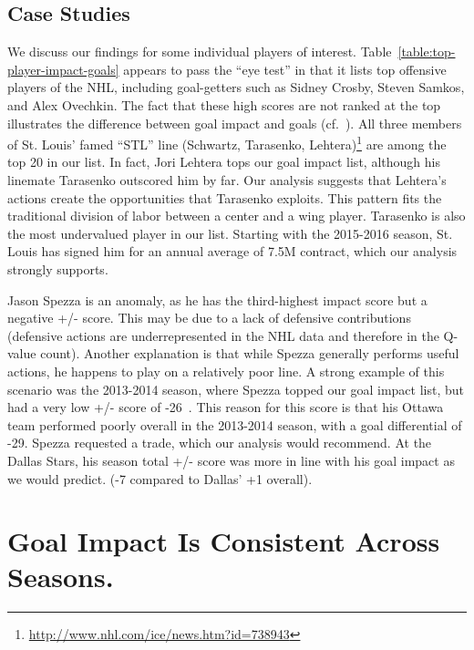 \documentclass[runningheads,a4paper]{llncs}
\begin{document}
\subsection{Case Studies} We discuss our findings for some individual players of interest.  Table~\ref{table:top-player-impact-goals} appears to pass the ``eye test'' in that it lists top offensive players of the NHL, including goal-getters such as Sidney Crosby, Steven Samkos, and Alex Ovechkin. The fact that these high scores are not ranked at the top illustrates the difference between goal impact and goals (cf.~\cite{Pettigrew2015}). All three members of St. Louis'  famed ``STL'' line
(Schwartz,  Tarasenko, Lehtera)\footnote{\url{http://www.nhl.com/ice/news.htm?id=738943}}   are among the top 20 in our list. In fact, Jori Lehtera tops our goal impact list, although his  linemate Tarasenko outscored him by far. Our analysis suggests that Lehtera's actions create the opportunities that Tarasenko exploits. This pattern fits the traditional division of labor between a center and a wing player. Tarasenko is also the most undervalued player in our list. Starting with the 2015-2016 season, St. Louis has signed him for an annual average of 7.5M contract, which our analysis strongly supports. 



Jason Spezza is an anomaly, as he has the third-highest impact score but a negative +/- score. This may be due to a lack of defensive contributions (defensive actions are underrepresented in the NHL data and therefore in the Q-value count). Another explanation is that while Spezza  generally performs useful actions, he happens to play on a relatively poor line. A strong example of this scenario was the 2013-2014 season, where Spezza topped our goal impact list, but had a very low +/- score of -26~\cite{Routley2015a}. This reason for this score is that his Ottawa team performed poorly overall in the 2013-2014 season, with a goal differential of -29. Spezza requested a trade, which our analysis would recommend. At the Dallas Stars, his season total +/- score was more in line with his goal impact as we would predict. (-7 compared to Dallas' +1 overall).

\section{Goal Impact Is Consistent Across Seasons.}
\end{document}
